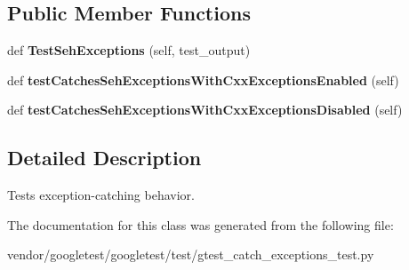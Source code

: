 \subsection*{Public Member Functions}
\begin{DoxyCompactItemize}
\item 
\mbox{\label{classgtest__catch__exceptions__test_1_1_catch_seh_exceptions_test_a737bbcc64405854aa8e0aea87ca5850b}} 
def {\bfseries Test\+Seh\+Exceptions} (self, test\+\_\+output)
\item 
\mbox{\label{classgtest__catch__exceptions__test_1_1_catch_seh_exceptions_test_a02d06790fb52416a9da6a28b624e9cd9}} 
def {\bfseries test\+Catches\+Seh\+Exceptions\+With\+Cxx\+Exceptions\+Enabled} (self)
\item 
\mbox{\label{classgtest__catch__exceptions__test_1_1_catch_seh_exceptions_test_a4a181de9de2b147eff55ed7a1d7d40c4}} 
def {\bfseries test\+Catches\+Seh\+Exceptions\+With\+Cxx\+Exceptions\+Disabled} (self)
\end{DoxyCompactItemize}


\subsection{Detailed Description}
\begin{DoxyVerb}Tests exception-catching behavior.\end{DoxyVerb}
 

The documentation for this class was generated from the following file\+:\begin{DoxyCompactItemize}
\item 
vendor/googletest/googletest/test/gtest\+\_\+catch\+\_\+exceptions\+\_\+test.\+py\end{DoxyCompactItemize}
